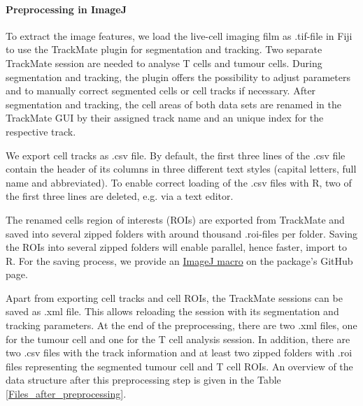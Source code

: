\documentclass{report}
\begin{document}
\paragraph{Preprocessing in ImageJ} 
To extract the image features, we load the live-cell imaging film as .tif-file in Fiji to use the TrackMate plugin for segmentation and tracking. Two separate TrackMate session are needed to analyse T cells and tumour cells. During segmentation and tracking, the plugin offers the possibility to adjust parameters and to manually correct segmented cells or cell tracks if necessary. After segmentation and tracking, the cell areas of both data sets are renamed in the TrackMate GUI by their assigned track name and an unique index for the respective track. 

We export cell tracks as .csv file. By default, the first three lines of the .csv file contain the header of its columns in three different text styles (capital letters, full name and abbreviated). To enable correct loading of the .csv files with R, two of the first three lines are deleted, e.g. via a text editor. 

The renamed cells region of interests (ROIs) are exported from TrackMate and saved into several zipped folders with around thousand .roi-files per folder. Saving the ROIs into several zipped folders will enable parallel, hence faster, import to R. For the saving process, we provide an \href{https://github.com/juliaquach02/cellcontacts/blob/main/ImageJ_Macros/Macro_Rename_and_Save_ROIs_in_Subfolders.ijm}{ImageJ macro} on the package's GitHub page.
 
Apart from exporting cell tracks and cell ROIs, the TrackMate sessions can be saved as .xml file. This allows reloading the session with its segmentation and tracking parameters. 
At the end of the preprocessing, there are two .xml files, one for the tumour cell and one for the T cell analysis session. In addition, there are two .csv files with the track information and at least two zipped folders with .roi files representing the segmented tumour cell and T cell ROIs. 
An overview of the data structure after this preprocessing step is given in the Table \ref{Files_after_preprocessing}.
\end{document}
